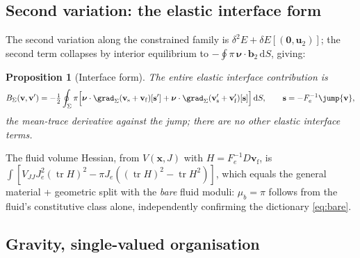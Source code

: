 \documentclass[11pt]{article}
\numberwithin{equation}{section}
\newtheorem{proposition}{Proposition}[section]
\theoremstyle{remark}
\newcommand{\dS}{\,\mathrm{d}S}
\newcommand{\tr}{\operatorname{tr}}
\newcommand{\vv}{\mathbf{v}}
\newcommand{\vs}{\mathbf{s}}
\newcommand{\vx}{\mathbf{x}}
\newcommand{\bnu}{\bm{\nu}}
\begin{document}
\subsection{Second variation: the elastic interface form}

The second variation along the constrained family is $\delta^2E +
\delta E[(\mathbf{0},\mathbf{u}_2)]$; the second term collapses by interior
equilibrium to $-\oint\pi\,\bnu\cdot\mathbf{b}_2\dS$, giving:
\begin{proposition}[Interface form]
The entire elastic interface contribution is
\begin{equation}
  B_\Sigma(\vv,\vv') = -\tfrac12\oint_\Sigma\pi\Bigl[
     \bnu\cdot\grad_\Sigma(\vv_{\mathrm{s}}+\vv_{\mathrm{f}})[\vs']
   + \bnu\cdot\grad_\Sigma(\vv'_{\mathrm{s}}+\vv'_{\mathrm{f}})[\vs]\Bigr]\dS,
  \qquad \vs = -F_e^{-1}\jump{\vv},
  \label{eq:BSigma}
\end{equation}
the mean-trace derivative against the jump; there are no other elastic
interface terms.
\end{proposition}
The fluid volume Hessian, from $V(\vx,J)$ with $H = F_e^{-1}D\vv_{\mathrm{f}}$,
is $\int[V_{JJ}J_e^2(\tr H)^2 - \pi J_e((\tr H)^2 - \tr H^2)]$, which equals
the general material + geometric split with the \emph{bare} fluid moduli:
$\mu_b = \pi$ follows from the fluid's constitutive class alone,
independently confirming the dictionary \eqref{eq:bare}.

\subsection{Gravity, single-valued organisation}
\end{document}
